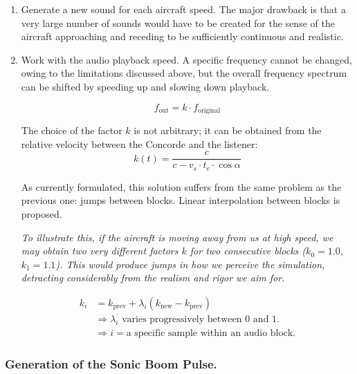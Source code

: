 \documentclass[10.5pt]{article}
\begin{document}
	\begin{enumerate}
		\item Generate a new sound for each aircraft speed. The major drawback is that a very large number of sounds would have to be created for the sense of the aircraft approaching and receding to be sufficiently continuous and realistic.
		
		\item Work with the audio playback speed. A specific frequency cannot be changed, owing to the limitations discussed above, but the overall frequency spectrum can be shifted by speeding up and slowing down playback.
		
		\begin{equation*}
			f_{\text{out}} = k \cdot f_{\text{original}}
		\end{equation*}
		
		The choice of the factor $k$ is not arbitrary; it can be obtained from the relative velocity between the Concorde and the listener:
		\begin{equation*}
			k(t) = \frac{c}{c - v_s \cdot t_e \cdot \cos \alpha}
		\end{equation*}
		
		As currently formulated, this solution suffers from the same problem as the previous one: jumps between blocks. Linear interpolation between blocks is proposed.
		
		\textit{To illustrate this, if the aircraft is moving away from us at high speed, we may obtain two very different factors $k$ for two consecutive blocks ($k_0 = 1.0$, $k_1 = 1.1$). This would produce jumps in how we perceive the simulation, detracting considerably from the realism and rigor we aim for.}
		
		\begin{align*}
			k_i &= k_{\text{prev}} + \lambda_i \left(k_{\text{new}} - k_{\text{prev}}\right) \\
			&\Rightarrow \text{$\lambda_i$ varies progressively between 0 and 1.} \\
			&\Rightarrow i = \text{a specific sample within an audio block.}
		\end{align*}
	\end{enumerate}
	
	\subsubsection{Generation of the Sonic Boom Pulse.}
	
\end{document}
